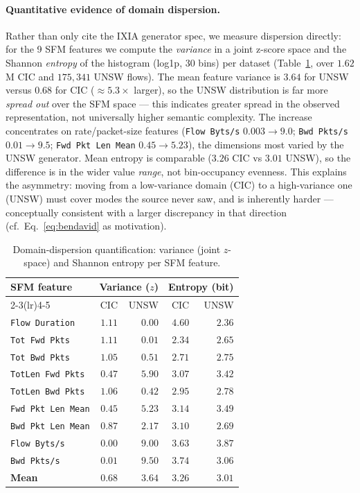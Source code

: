 \documentclass[preprint,12pt,authoryear]{elsarticle}
\begin{document}
\paragraph{Quantitative evidence of domain dispersion.} Rather than only cite the
IXIA generator spec, we measure dispersion directly: for the 9 SFM features we
compute the \emph{variance} in a joint z-score space and the Shannon \emph{entropy}
of the histogram (log1p, 30 bins) per dataset (Table~\ref{tab:complexity}, over
$1.62$M CIC and $175{,}341$ UNSW flows). The mean feature variance is $\mathbf{3.64}$
for UNSW versus $\mathbf{0.68}$ for CIC ($\approx 5.3\times$ larger), so the UNSW
distribution is far more \emph{spread out} over the SFM space --- this indicates
greater spread in the observed representation, not universally higher semantic
complexity. The increase concentrates on rate/packet-size features (\texttt{Flow
Byts/s} $0.003\to9.0$; \texttt{Bwd Pkts/s} $0.01\to9.5$; \texttt{Fwd Pkt Len Mean}
$0.45\to5.23$), the dimensions most varied by the UNSW generator. Mean entropy is
comparable ($3.26$ CIC vs $3.01$ UNSW), so the difference is in the wider value
\emph{range}, not bin-occupancy evenness. This explains the asymmetry: moving from a
low-variance domain (CIC) to a high-variance one (UNSW) must cover modes the source
never saw, and is inherently harder --- conceptually consistent with a larger
discrepancy in that direction (cf.\ Eq.~\eqref{eq:bendavid} as motivation).

\begin{table}[htbp]
\centering
\caption{Domain-dispersion quantification: variance (joint $z$-space) and Shannon
entropy per SFM feature.}
\label{tab:complexity}
\small
\begin{tabular}{lrrrr}
\toprule
\multirow{2}{*}{SFM feature} & \multicolumn{2}{c}{Variance ($z$)} & \multicolumn{2}{c}{Entropy (bit)} \\
\cmidrule(lr){2-3}\cmidrule(lr){4-5}
 & CIC & UNSW & CIC & UNSW \\
\midrule
\texttt{Flow Duration}    & $1.11$ & $0.00$ & $4.60$ & $2.36$ \\
\texttt{Tot Fwd Pkts}     & $1.11$ & $0.01$ & $2.34$ & $2.65$ \\
\texttt{Tot Bwd Pkts}     & $1.05$ & $0.51$ & $2.71$ & $2.75$ \\
\texttt{TotLen Fwd Pkts}  & $0.47$ & $5.90$ & $3.07$ & $3.42$ \\
\texttt{TotLen Bwd Pkts}  & $1.06$ & $0.42$ & $2.95$ & $2.78$ \\
\texttt{Fwd Pkt Len Mean} & $0.45$ & $5.23$ & $3.14$ & $3.49$ \\
\texttt{Bwd Pkt Len Mean} & $0.87$ & $2.17$ & $3.10$ & $2.69$ \\
\texttt{Flow Byts/s}      & $0.00$ & $9.00$ & $3.63$ & $3.87$ \\
\texttt{Bwd Pkts/s}       & $0.01$ & $9.50$ & $3.74$ & $3.06$ \\
\midrule
\textbf{Mean}             & $\mathbf{0.68}$ & $\mathbf{3.64}$ & $3.26$ & $3.01$ \\
\bottomrule
\end{tabular}
\end{table}
\end{document}
